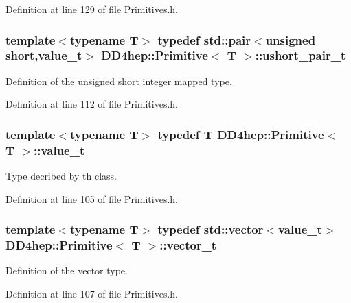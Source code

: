 Definition at line 129 of file Primitives.h.\hypertarget{struct_d_d4hep_1_1_primitive_a17a1fe85259c15331aeaa9e4f3f25ac0}{
\subsubsection[{ushort\_\-pair\_\-t}]{\setlength{\rightskip}{0pt plus 5cm}template$<$typename T$>$ typedef std::pair$<$unsigned short,{\bf value\_\-t}$>$ {\bf DD4hep::Primitive}$<$ {\bf T} $>$::{\bf ushort\_\-pair\_\-t}}}
\label{struct_d_d4hep_1_1_primitive_a17a1fe85259c15331aeaa9e4f3f25ac0}


Definition of the unsigned short integer mapped type. 

Definition at line 112 of file Primitives.h.\hypertarget{struct_d_d4hep_1_1_primitive_a0639e73bb8f07f99c2d8401f807a7af6}{
\subsubsection[{value\_\-t}]{\setlength{\rightskip}{0pt plus 5cm}template$<$typename T$>$ typedef {\bf T} {\bf DD4hep::Primitive}$<$ {\bf T} $>$::{\bf value\_\-t}}}
\label{struct_d_d4hep_1_1_primitive_a0639e73bb8f07f99c2d8401f807a7af6}


Type decribed by th class. 

Definition at line 105 of file Primitives.h.\hypertarget{struct_d_d4hep_1_1_primitive_a811bb3e2e990b586cd6669ce73de1c50}{
\subsubsection[{vector\_\-t}]{\setlength{\rightskip}{0pt plus 5cm}template$<$typename T$>$ typedef std::vector$<${\bf value\_\-t}$>$ {\bf DD4hep::Primitive}$<$ {\bf T} $>$::{\bf vector\_\-t}}}
\label{struct_d_d4hep_1_1_primitive_a811bb3e2e990b586cd6669ce73de1c50}


Definition of the vector type. 

Definition at line 107 of file Primitives.h.

